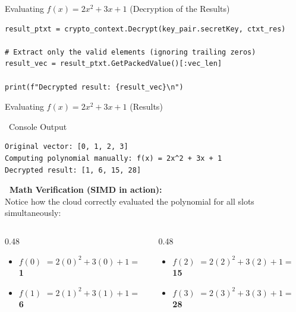 \documentclass[aspectratio=169, 10pt]{beamer}
\begin{document}
\begin{frame}[fragile]{Evaluating $f(x) = 2x^2 + 3x + 1$ (Decryption of the Results)}
\vspace{0.3cm}
\begin{lstlisting}[firstnumber=60]
result_ptxt = crypto_context.Decrypt(key_pair.secretKey, ctxt_res)
    
# Extract only the valid elements (ignoring trailing zeros)
result_vec = result_ptxt.GetPackedValue()[:vec_len]
    
print(f"Decrypted result: {result_vec}\n")
\end{lstlisting}
\end{frame}

\begin{frame}[fragile]{Evaluating $f(x) = 2x^2 + 3x + 1$ (Results)}
\vspace{0.1cm}

\begin{exampleblock}{\faTerminal \ Console Output}
\begin{lstlisting}[language={}, basicstyle=\ttfamily\scriptsize\color{white}, backgroundcolor=\color{black!85}, numbers=none]
Original vector: [0, 1, 2, 3]
Computing polynomial manually: f(x) = 2x^2 + 3x + 1
Decrypted result: [1, 6, 15, 28]
\end{lstlisting}
\end{exampleblock}

\vspace{0.2cm}
\large \textbf{\textcolor{mygreen}{\faCheckCircle} \ Math Verification (SIMD in action):} \\
\small
\vspace{0.1cm}
Notice how the cloud correctly evaluated the polynomial for all slots simultaneously:

\vspace{0.1cm}
\begin{columns}
    \begin{column}{0.48\textwidth}
        \begin{itemize}
            \item \textcolor{DeepBlue}{$f(0)$} $= 2(0)^2 + 3(0) + 1 =$ \textbf{1}
            \item \textcolor{DeepBlue}{$f(1)$} $= 2(1)^2 + 3(1) + 1 =$ \textbf{6}
        \end{itemize}
    \end{column}
    \begin{column}{0.48\textwidth}
        \begin{itemize}
            \item \textcolor{DeepBlue}{$f(2)$} $= 2(2)^2 + 3(2) + 1 =$ \textbf{15}
            \item \textcolor{DeepBlue}{$f(3)$} $= 2(3)^2 + 3(3) + 1 =$ \textbf{28}
        \end{itemize}
    \end{column}
\end{columns}

\end{frame}
\end{document}
